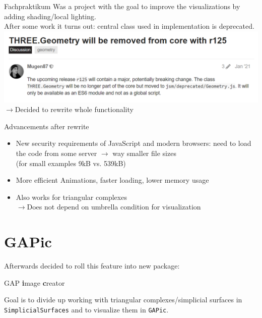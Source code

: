 \documentclass{beamer}
\numberwithin{equation}{aufgabe}
\begin{document}
\begin{frame}
    \begin{exampleblock}{Fachpraktikum}
        Was a project with the goal to improve the visualizations by adding shading/local lighting.
        \pause \\
        After some work it turns out: central class used in implementation is deprecated.
        \includegraphics[width=1\textwidth]{images/three-deprecated.png}
        \pause \\ 
        $\xrightarrow{}$Decided to rewrite whole functionality
    \end{exampleblock}
\end{frame}

\begin{frame}
    \begin{exampleblock}{Advancements after rewrite}
        \begin{itemize}[label=-]
            \item New security requirements of JavaScript and modern browsers: need to load the code from some server $\xrightarrow{}$ way smaller file sizes\\
                (for small examples 9kB vs. 539kB)
                \pause
            \item More efficient Animations, faster loading, lower memory usage
                \pause
            \item Also works for triangular complexes\\
            $\xrightarrow{}$Does not depend on umbrella condition for visualization\\
        \end{itemize}
    \end{exampleblock}
\end{frame}

\section{GAPic}
\begin{frame}
    Afterwards decided to roll this feature into new package: \\
    \begin{center}
        GAP \textbf{i}mage \textbf{c}reator    
    \end{center}
    \pause
    Goal is to divide up working with triangular complexes/simplicial surfaces in \texttt{SimplicialSurfaces} and to visualize them in \texttt{GAPic}.
\end{frame}
\end{document}
